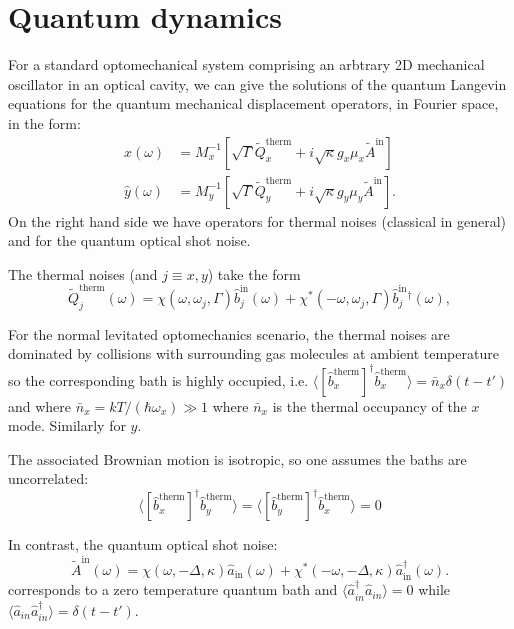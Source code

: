 \documentclass[twocolumn,english,notitlepage,superscriptaddress,nofootinbib]{revtex4-2}
\begin{document}
  

\section{Quantum dynamics}


For a standard optomechanical system comprising an arbtrary  2D mechanical oscillator in an optical cavity, 
 we can give the solutions of the quantum Langevin equations
for the quantum mechanical displacement operators,  in Fourier space,  in the form:
\begin{eqnarray}
\hat{x}(\omega) & = M_{x}^{-1}\left[\sqrt{\Gamma}\tilde{Q}_x^{\text{therm}}+i\sqrt{\kappa}g_{x}\mu_{x}\tilde{A}^{\textrm{in}}\right ] \nonumber \\
\hat{y}(\omega) & = M_{y}^{-1}\left[\sqrt{\Gamma}\tilde{Q}_y^{\text{therm}}+i\sqrt{\kappa}g_{y}\mu_{y}\tilde{A}^{\textrm{in}}\right].
\label{1DDisplace1}
\end{eqnarray}
On the right hand side we have operators for thermal noises (classical in general) and for the quantum optical shot noise.

The thermal noises (and $j\equiv x,y$)  take the form
\begin{equation}
\tilde{Q}_{j}^{\text{therm}}(\omega)=\chi(\omega,\omega_{j},\Gamma)\hat{b}_{j}^{\text{in}}(\omega)+\chi^{*}(-\omega,\omega_{j},\Gamma)\hat{b}_{j}^{\text{in}}{}^{\dagger}(\omega),
\end{equation}

For the normal levitated optomechanics scenario,  the thermal noises are dominated by collisions with  surrounding gas molecules at ambient 
temperature so the corresponding bath is highly occupied, i.e.  
$\langle [\hat{b}_x^{\text{therm}}]^\dagger \hat{b}_x^{\text{therm}}\rangle= \bar{n}_x\delta(t-t')$ and where $\bar{n}_x=kT/(\hbar \omega_x)\gg 1$ where $\bar{n}_x$ is the thermal occupancy of the $x$ mode.  Similarly for $y$.

The associated Brownian motion is isotropic, so one assumes the baths are uncorrelated:
\begin{equation}
  \langle  [\hat{b}_x^{\text{therm}}]^\dagger \hat{b}_y^{\text{therm}}\rangle =\langle  [\hat{b}_y^{\text{therm}}]^\dagger \hat{b}_x^{\text{therm}}\rangle  =0
\label{Uncorr}
\end{equation}


In contrast, the quantum optical shot noise:
\begin{equation}
\tilde{A}^{\textrm{in}}(\omega)=\chi(\omega,-\Delta,\kappa) \hat{a}_{\text{in}}(\omega)+\chi^{*}(-\omega,-\Delta,\kappa)\hat{a}_{\text{in}}^{\dagger}(\omega).
\end{equation}
corresponds to a zero temperature quantum bath and $\langle \hat{a}_{in}^\dagger \hat{a}_{in}\rangle= 0$ while
$\langle \hat{a}_{in} \hat{a}_{in}^\dagger\rangle= \delta(t-t')$.
\end{document}
